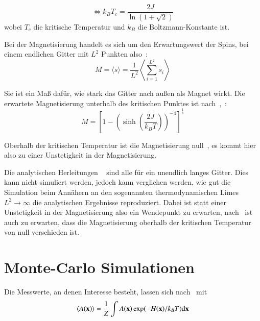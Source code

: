 	\begin{equation}
	\Leftrightarrow k_BT_c=\frac{2J}{\ln(1+\sqrt{2})}
	\label{eq:kritischetemperatur}
	\end{equation}
	wobei $T_c$ die kritische Temperatur und $k_B$ die Boltzmann-Konstante ist.
	
	
	Bei der Magnetisierung handelt es sich um den Erwartungswert der Spins, bei einem endlichen Gitter mit $L^2$ Punkten also~\cite[vgl. ][S. 8]{binderheermann}:
	\begin{equation}
	M=\langle s \rangle=\frac{1}{L^2}\left\langle  \sum_{i=1}^{L^2} s_i \right\rangle
	\label{eq:magnetisierung}
	\end{equation}

	
	Sie ist ein Maß dafür, wie stark das Gitter nach außen als Magnet wirkt. Die erwartete Magnetisierung unterhalb des kritischen Punktes ist nach~\cite{YangMagnetization},~\cite{MontrollMagnetization}:
	\begin{equation} M=\left[1-\left(\sinh\left(\frac{2J}{k_BT}\right)\right)^{-4}\right]^{\frac{1}{8}}
	\label{eq:magnetisierungsgleichungliteratur}
	\end{equation}
	
	Oberhalb der kritischen Temperatur ist die Magnetisierung null~\cite[Gl. 81]{MontrollMagnetization}, es kommt hier also zu einer Unstetigkeit in der Magnetisierung.
	
	Die analytischen Herleitungen ~\cite{OnsagerCrystal1,YangMagnetization,MontrollMagnetization} sind alle für ein unendlich langes Gitter. Dies kann nicht simuliert werden, jedoch kann verglichen werden, wie gut die Simulation beim Annähern an den sogenannten thermodynamischen Limes $L^2\to\infty$ die analytischen Ergebnisse reproduziert.
	Dabei ist statt einer Unstetigkeit in der Magnetisierung also ein Wendepunkt zu erwarten, nach~\cite[S. 45ff., S.101f.]{binderheermann} ist auch zu erwarten, dass die Magnetisierung oberhalb der kritischen Temperatur von null verschieden ist.%
	
	
	\section{Monte-Carlo Simulationen}
	\label{sec:mctheorie}
	Die Messwerte, an denen Interesse besteht, lassen sich nach~\cite[S. 8]{binderheermann}  mit \[
	\langle A(\mathbf{x}) \rangle=\frac{1}{Z}\int A(\mathbf{x}) \exp(-H(\mathbf{x})/k_BT)\text{d} \mathbf{x}\]
	
